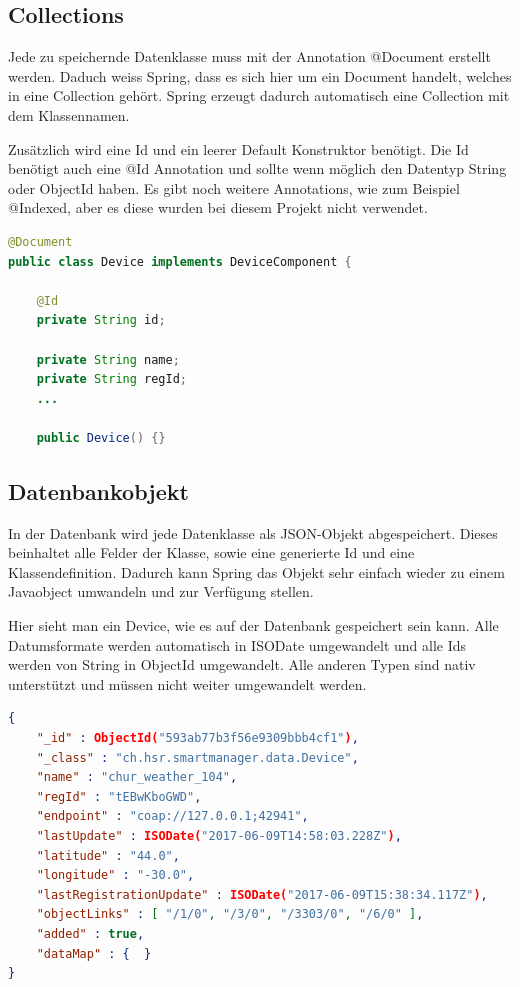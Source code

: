 \subsection{Collections}
Jede zu speichernde Datenklasse muss mit der Annotation @Document erstellt werden. Daduch weiss Spring, dass es sich hier um ein Document handelt, welches in eine Collection gehört. Spring erzeugt dadurch automatisch eine Collection mit dem Klassennamen.

Zusätzlich wird eine Id und ein leerer Default Konstruktor benötigt. Die Id benötigt auch eine @Id Annotation und sollte wenn möglich den Datentyp String oder ObjectId haben. Es gibt noch weitere Annotations, wie zum Beispiel @Indexed, aber es diese wurden bei diesem Projekt nicht verwendet. 
\begin{lstlisting}[language=java]
@Document
public class Device implements DeviceComponent {

	@Id
	private String id;

	private String name;
	private String regId;
	...
	
	public Device() {}
\end{lstlisting}

\subsection{Datenbankobjekt}
In der Datenbank wird jede Datenklasse als JSON-Objekt abgespeichert. Dieses beinhaltet alle Felder der Klasse, sowie eine generierte Id und eine Klassendefinition. Dadurch kann Spring das Objekt sehr einfach wieder zu einem Javaobject umwandeln und zur Verfügung stellen.

Hier sieht man ein Device, wie es auf der Datenbank gespeichert sein kann. Alle Datumsformate werden automatisch in ISODate umgewandelt und alle Ids werden von String in ObjectId umgewandelt. Alle anderen Typen sind nativ unterstützt und müssen nicht weiter umgewandelt werden.
\begin{lstlisting}[language=json]
{ 
	"_id" : ObjectId("593ab77b3f56e9309bbb4cf1"), 
	"_class" : "ch.hsr.smartmanager.data.Device", 
	"name" : "chur_weather_104", 
	"regId" : "tEBwKboGWD", 
	"endpoint" : "coap://127.0.0.1;42941", 
	"lastUpdate" : ISODate("2017-06-09T14:58:03.228Z"), 
	"latitude" : "44.0", 
	"longitude" : "-30.0", 
	"lastRegistrationUpdate" : ISODate("2017-06-09T15:38:34.117Z"),
	"objectLinks" : [ "/1/0", "/3/0", "/3303/0", "/6/0" ], 
	"added" : true, 
	"dataMap" : {  } 
}
\end{lstlisting}

